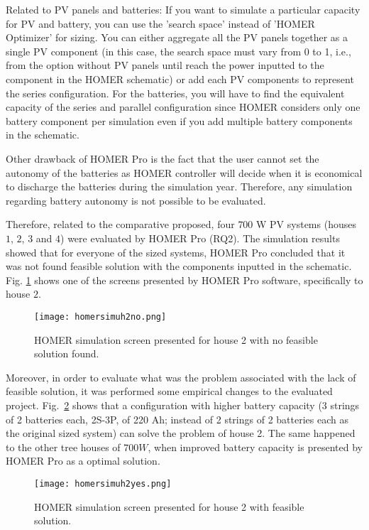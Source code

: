 Related to PV panels and batteries: If you want to simulate a particular capacity for PV and battery, you can use the 'search space' instead of 'HOMER Optimizer' for sizing. You can either aggregate all the PV panels together as a single PV component (in this case, the search space must vary from 0 to 1, i.e., from the option without PV panels until reach the power inputted to the component in the HOMER schematic) or add each PV components to represent the series configuration. For the batteries, you will have to find the equivalent capacity of the series and parallel configuration since HOMER considers only one battery component per simulation even if you add multiple battery components in the schematic.

Other drawback of HOMER Pro is the fact that the user cannot set the autonomy of the batteries as HOMER controller will decide when it is economical to discharge the batteries during the simulation year. Therefore, any simulation regarding battery autonomy is not possible to be evaluated.

Therefore, related to the comparative proposed, four $700$ W PV systems (houses $1$, $2$, $3$ and $4$) were evaluated by HOMER Pro (RQ2). The simulation results showed that for everyone of the sized systems, HOMER Pro concluded that it was not found feasible solution with the components inputted in the schematic. Fig. \ref{fig:homersimuh2no} shows one of the screens presented by HOMER Pro software, specifically to house $2$.

\begin{figure}[h]
\texttt{[image: homersimuh2no.png]}
\centering
\caption{HOMER simulation screen presented for house 2 with no feasible solution found.}
\label{fig:homersimuh2no}
\end{figure}

Moreover, in order to evaluate what was the problem associated with the lack of feasible solution, it was performed some empirical changes to the evaluated project. Fig.~\ref{fig:homersimuh2yes} shows that a configuration with higher battery capacity (3 strings of 2 batteries each, 2S-3P, of 220 Ah; instead of 2 strings of 2 batteries each as the original sized system) can solve the problem of house 2. The same happened to the other tree houses of $700 W$, when improved battery capacity is presented by HOMER Pro as a optimal solution.

\begin{figure}[h]
\texttt{[image: homersimuh2yes.png]}
\centering
\caption{HOMER simulation screen presented for house 2 with feasible solution.}
\label{fig:homersimuh2yes}
\end{figure}

